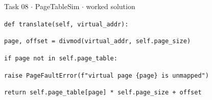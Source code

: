\documentclass[11pt]{article}
\begin{document}
\begin{keepsection}
\begin{workedbox}{Task 08 \ensuremath{\cdot} PageTableSim \ensuremath{\cdot} worked solution}
\begin{enumerate}
\begin{tcolorbox}[colback=Paperblue,colframe=Paperblue,boxrule=0pt,arc=0pt,left=7pt,right=7pt,top=5pt,bottom=5pt]
\noindent\hspace*{0em}\texttt{}\par
\noindent\hspace*{1em}\texttt{def translate(self, virtual\_addr):}\par
\noindent\hspace*{3em}\texttt{page, offset = divmod(virtual\_addr, self.page\_size)}\par
\noindent\hspace*{3em}\texttt{if page not in self.page\_table:}\par
\noindent\hspace*{5em}\texttt{raise PageFaultError(f"virtual page \{page\} is unmapped")}\par
\noindent\hspace*{3em}\texttt{return self.page\_table[page] * self.page\_size + offset}\par
\end{tcolorbox}
\end{enumerate}
\end{workedbox}

\end{keepsection}
\end{document}
